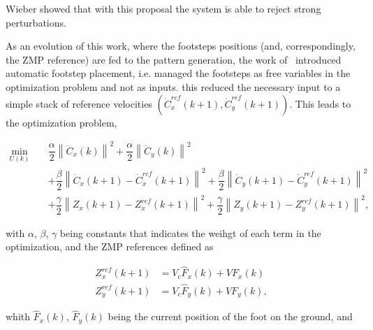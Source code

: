 Wieber showed that with this proposal the system is able to reject strong perturbations.

As an evolution of this work, where the footsteps positions (and, correspondingly, the ZMP reference) are fed to the pattern generation, the work of~\citep{HerdtAR2010} introduced automatic footstep placement, i.e. managed the footsteps as free variables in the optimization problem and not as inputs. this reduced the necessary input to a simple stack of reference velocities $(\dot{C}_{x}^{ref}(k+1),\dot{C}_{y}^{ref}(k+1))$. This leads to the optimization problem,

\begin{eqnarray}
\nonumber
 \underset{U(k)}{\min} \; && \dfrac{\alpha}{2} \left\| \dddot{C}_x(k) \right\|^2 + \dfrac{\alpha}{2} \left\| \dddot{C}_y(k) \right\|^2 \\
&& + \dfrac{\beta}{2} \left\| \dot{C}_{x}(k+1) - \dot{C}_{x}^{ref}(k+1) \right\|^2 + \dfrac{\beta}{2} \left\| \dot{C}_{y}(k+1) - \dot{C}_{y}^{ref}(k+1) \right\|^2  \nonumber \\
&& + \dfrac{\gamma}{2} \left\| Z_x(k+1) - Z_x^{ref}(k+1) \right\|^2 + \dfrac{\gamma}{2} \left\| Z_y(k+1) - Z_y^{ref}(k+1) \right\|^2,
\label{Eq:MinJerk}
\end{eqnarray}

with $\alpha$, $\beta$, $\gamma$ being constants that indicates the weihgt of each term in the optimization, and the ZMP references defined as

\begin{eqnarray}
\label{Eq:ZMPReference}
  Z_x^{ref}(k+1) & = V_c \hat{F}_x(k) + V F_x(k) \nonumber \\
  Z_y^{ref}(k+1) & = V_c \hat{F}_y(k) + V F_y(k),
\end{eqnarray}

whith $\hat{F}_x(k)$, $\hat{F}_y(k)$ being the current position of the foot on
the ground, and

